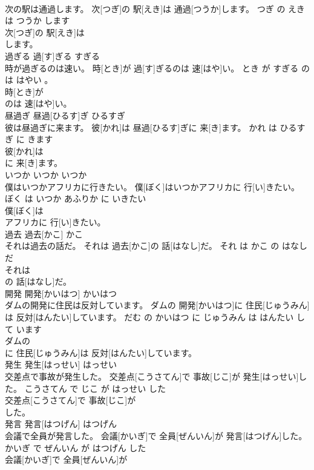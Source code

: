 \documentclass[8pt]{extreport}
\begin{document}
\begin{CJK}{UTF8}{min}
\\	次の駅は通過します。	次[つぎ]の 駅[えき]は 通過[つうか]します。	つぎ の えき は つうか します	
\\	次[つぎ]の 駅[えき]は
\\	します。		
\\	過ぎる	過[す]ぎる	すぎる	
\\	時が過ぎるのは速い。	時[とき]が 過[す]ぎるのは 速[はや]い。	とき が すぎる の は はやい 。	
\\	時[とき]が
\\	のは 速[はや]い。		
\\	昼過ぎ	昼過[ひるす]ぎ	ひるすぎ	
\\	彼は昼過ぎに来ます。	彼[かれ]は 昼過[ひるす]ぎに 来[き]ます。	かれ は ひるすぎ に きます	
\\	彼[かれ]は
\\	に 来[き]ます。		
\\	いつか	いつか	いつか	
\\	僕はいつかアフリカに行きたい。	僕[ぼく]はいつかアフリカに 行[い]きたい。	ぼく は いつか あふりか に いきたい	
\\	僕[ぼく]は
\\	アフリカに 行[い]きたい。		
\\	過去	過去[かこ]	かこ	
\\	それは過去の話だ。	それは 過去[かこ]の 話[はなし]だ。	それ は かこ の はなし だ	
\\	それは
\\	の 話[はなし]だ。		
\\	開発	開発[かいはつ]	かいはつ	
\\	ダムの開発に住民は反対しています。	ダムの 開発[かいはつ]に 住民[じゅうみん]は 反対[はんたい]しています。	だむ の かいはつ に じゅうみん は はんたい して います	
\\	ダムの
\\	に 住民[じゅうみん]は 反対[はんたい]しています。		
\\	発生	発生[はっせい]	はっせい	
\\	交差点で事故が発生した。	交差点[こうさてん]で 事故[じこ]が 発生[はっせい]した。	こうさてん で じこ が はっせい した	
\\	交差点[こうさてん]で 事故[じこ]が
\\	した。		
\\	発言	発言[はつげん]	はつげん	
\\	会議で全員が発言した。	会議[かいぎ]で 全員[ぜんいん]が 発言[はつげん]した。	かいぎ で ぜんいん が はつげん した	
\\	会議[かいぎ]で 全員[ぜんいん]が

\end{CJK}
\end{document}
